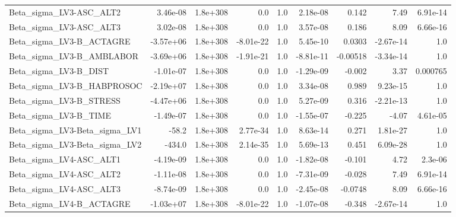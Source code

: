 \begin{tabular}{lrrrrrrrr}
Beta\_sigma\_LV3-ASC\_ALT2       &    3.46e-08 &     1.8e+308 &       0.0 &      1.0 &   2.18e-08 &       0.142 &         7.49 &      6.91e-14 \\
Beta\_sigma\_LV3-ASC\_ALT3       &    3.02e-08 &     1.8e+308 &       0.0 &      1.0 &   3.57e-08 &       0.186 &         8.09 &      6.66e-16 \\
Beta\_sigma\_LV3-B\_ACTAGRE      &   -3.57e+06 &     1.8e+308 & -8.01e-22 &      1.0 &   5.45e-10 &      0.0303 &    -2.67e-14 &           1.0 \\
Beta\_sigma\_LV3-B\_AMBLABOR     &   -3.69e+06 &     1.8e+308 & -1.91e-21 &      1.0 &  -8.81e-11 &    -0.00518 &    -3.34e-14 &           1.0 \\
Beta\_sigma\_LV3-B\_DIST         &   -1.01e-07 &     1.8e+308 &       0.0 &      1.0 &  -1.29e-09 &      -0.002 &         3.37 &      0.000765 \\
Beta\_sigma\_LV3-B\_HABPROSOC    &   -2.19e+07 &     1.8e+308 &       0.0 &      1.0 &   3.34e-08 &       0.989 &     9.23e-15 &           1.0 \\
Beta\_sigma\_LV3-B\_STRESS       &   -4.47e+06 &     1.8e+308 &       0.0 &      1.0 &   5.27e-09 &       0.316 &    -2.21e-13 &           1.0 \\
Beta\_sigma\_LV3-B\_TIME         &   -1.49e-07 &     1.8e+308 &       0.0 &      1.0 &  -1.55e-07 &      -0.225 &        -4.07 &      4.61e-05 \\
Beta\_sigma\_LV3-Beta\_sigma\_LV1 &       -58.2 &     1.8e+308 &  2.77e-34 &      1.0 &   8.63e-14 &       0.271 &     1.81e-27 &           1.0 \\
Beta\_sigma\_LV3-Beta\_sigma\_LV2 &      -434.0 &     1.8e+308 &  2.14e-35 &      1.0 &   5.69e-13 &       0.451 &     6.09e-28 &           1.0 \\
Beta\_sigma\_LV4-ASC\_ALT1       &   -4.19e-09 &     1.8e+308 &       0.0 &      1.0 &  -1.82e-08 &      -0.101 &         4.72 &       2.3e-06 \\
Beta\_sigma\_LV4-ASC\_ALT2       &   -1.11e-08 &     1.8e+308 &       0.0 &      1.0 &  -7.31e-09 &      -0.028 &         7.49 &      6.91e-14 \\
Beta\_sigma\_LV4-ASC\_ALT3       &   -8.74e-09 &     1.8e+308 &       0.0 &      1.0 &  -2.45e-08 &     -0.0748 &         8.09 &      6.66e-16 \\
Beta\_sigma\_LV4-B\_ACTAGRE      &   -1.03e+07 &     1.8e+308 & -8.01e-22 &      1.0 &  -1.07e-08 &      -0.348 &    -2.67e-14 &           1.0 \\

\end{tabular}
